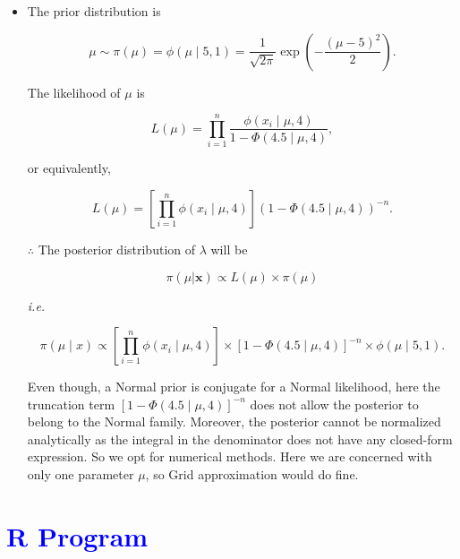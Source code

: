 \documentclass[11pt, a4paper]{article}\usepackage[]{graphicx}\usepackage[]{xcolor}
\begin{document}
\begin{itemize}

\item[\scalebox{2.0}{\twemoji{keycap: 1}}] \hspace{0.1cm} The prior distribution is 

$$\mu \sim \pi(\mu) = \phi(\mu \mid 5, 1) = \dfrac{1}{\sqrt{2\pi}} \exp \left( - \dfrac{(\mu - 5)^2}{2} \right).$$

The likelihood of $\mu$ is

$$L(\mu) = \prod\limits_{i=1}^{n} \dfrac{\phi(x_i \mid \mu, 4)}{1 - \Phi(4.5 \mid \mu, 4)},$$

or equivalently,

$$L(\mu) = \left[ \prod\limits_{i=1}^{n} \phi(x_i \mid \mu, 4) \right] \left( 1 - \Phi(4.5 \mid \mu, 4) \right)^{-n}.$$

\newpage

$\therefore$ The posterior distribution of $\lambda$ will be

$$\pi(\mu | \mathbf{x}) \propto L(\mu) \times \pi(\mu)$$

\textit{i.e.}

$$\pi(\mu \mid x) \propto \left[ \prod\limits_{i=1}^{n} \phi(x_i \mid \mu, 4) \right] \times \left[ 1 - \Phi(4.5 \mid \mu, 4) \right]^{-n} \times \phi(\mu \mid 5, 1).$$

Even though, a Normal prior is conjugate for a Normal likelihood, here the truncation term $\left[ 1 - \Phi(4.5 \mid \mu, 4) \right]^{-n}$ does not allow the posterior to belong to the Normal family. Moreover, the posterior cannot be normalized analytically as the integral in the denominator does not have any closed-form expression. So we opt for numerical methods. Here we are concerned with only one parameter $\mu$, so Grid approximation would do fine.

\end{itemize}

\section*{\faArrowAltCircleRight[regular] \textcolor{blue}{R Program}}
\end{document}
